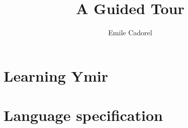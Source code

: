 \documentclass[twoside,a4paper,11pt]{book}
\author{Emile Cadorel}
\title{A Guided Tour}
\begin{document}
\setlength{\aweboxleftmargin}{0.08\linewidth}
\setlength{\aweboxcontentwidth}{0.84\linewidth}


\ymirtitlepage

\dominitoc
\dominilof
\dominilot



\cleardoublepage
\begingroup
\hypersetup{linkcolor=black}
\tableofcontents
\endgroup

\nopagecolor{}
\part{Learning Ymir}






\cleardoublepage
\pagecolor{gray!10!white}
\part{Language specification}
\end{document}
